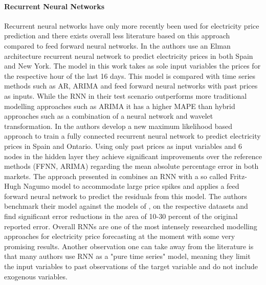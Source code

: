 \paragraph{Recurrent Neural Networks}
Recurrent neural networks have only more recently been used for electricity price prediction and there exists overall less literature based on this approach compared to feed forward neural networks. In \cite{anbazhagan_day-ahead_2013} the authors use an Elman architecture recurrent neural network to predict electricity prices in both Spain and New York. The model in this work takes as sole input variables the prices for the respective hour of the last 16 days. This model is compared with time series methods such as AR, ARIMA and feed forward neural networks with past prices as inputs. While the RNN in their test scenario outperforms more traditional modelling approaches such as ARIMA it has a higher MAPE than hybrid approaches such as a combination of a neural network and wavelet transformation. In \cite{mirikitani_nonlinear_2011} the authors develop a new maximum likelihood based approach to train a fully connected recurrent neural network to predict electricity prices in Spain and Ontario. Using only past prices as input variables and 6 nodes in the hidden layer they achieve significant improvements over the reference methods (FFNN, ARIMA) regarding the mean absolute percentage error in both markets. The approach presented in  \cite{sharma_hybrid_2013} combines an RNN with a so called Fritz-Hugh Nagumo model to accommodate large price spikes and applies a feed forward neural network to predict the residuals from this model. The authors benchmark their model against the models of \cite{mirikitani_nonlinear_2011}, \cite{zareipour_application_2006} on the respective datasets and find significant error reductions in the area of 10-30 percent of the original reported error. Overall RNNs are one of the most intensely researched modelling approaches for electricity price forecasting at the moment with some very promising results. Another observation one can take away from the literature is that many authors use RNN as a "pure time series" model, meaning they limit the input variables to past observations of the target variable and do not include exogenous variables.




